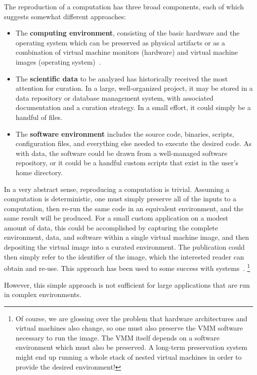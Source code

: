 \documentclass[procedia]{easychair}
\begin{document}
The reproduction of a computation has three broad components,
each of which suggests somewhat different approaches:

\begin{itemize}
\item The {\bf computing environment}, consisting of the basic hardware and the operating system which can be preserved as physical artifacts or as a combination of virtual machine monitors (hardware) and virtual machine images (operating system)~\cite{matthews2009towards}.
\item The {\bf scientific data} to be analyzed has historically received the most attention for curation.  In a large, well-organized project, it may be stored in a  data repository or database management system, with associated documentation and a curation strategy.  In a small effort, it could simply be a handful of files.
\item The {\bf software environment} includes the source code, binaries, scripts, configuration files, and everything else needed to execute the desired code.  As with data, the software could be drawn from a well-managed software repository, or it could be a handful custom scripts that exist in the user's home directory.
\end{itemize}

In a very abstract sense, reproducing a computation is trivial.
Assuming a computation is deterministic, one must simply
preserve all of the inputs to a computation, then re-run
the same code in an equivalent environment, and the same result
will be produced.  For a small custom application on a modest
amount of data, this could be accomplished by capturing the
complete environment,
data, and software within a single virtual machine image,
and then depositing the virtual
image into a curated environment.  The publication could
then simply refer to the identifier of the image, which the
interested reader can obtain and re-use. This approach has
been used to some success with systems~\cite{castagne2013consider}.
\footnote{Of course, we are glossing over the problem that hardware
architectures and virtual machines also change, so one must also
preserve the VMM software necessary to run the image.  The VMM itself
depends on a software environment which must also be preserved.
A long-term preservation system might end up running a whole
stack of nested virtual machines in order to provide the desired
environment! }

However, this simple approach is not sufficient for large applications
that are run in complex environments.
\end{document}
